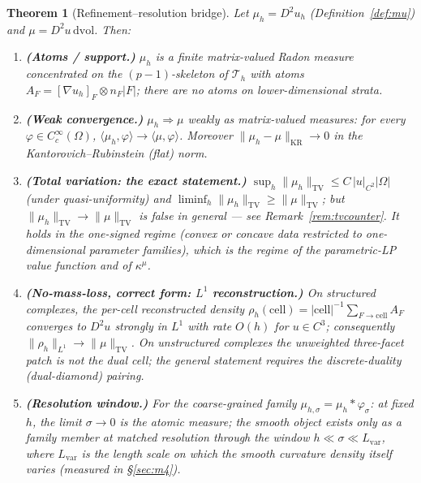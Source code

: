 \documentclass[11pt,a4paper]{article}
\theoremstyle{plain}
\newtheorem{theorem}{Theorem}[section]
\theoremstyle{definition}
\theoremstyle{remark}
\newcommand{\kmu}{\kappa^{\mu}}
\newcommand{\TV}{\mathrm{TV}}
\newcommand{\dvol}{\,\mathrm{dvol}}
\DeclareMathOperator{\KR}{KR}
\begin{document}
\begin{theorem}[Refinement--resolution bridge]
\label{thm:Bprime}
Let $\mu_h = D^2 u_h$ (Definition~\ref{def:mu}) and
$\mu = D^2u \dvol$. Then:
\begin{enumerate}[label=(\roman*),leftmargin=2em]
\item \textbf{(Atoms / support.)} $\mu_h$ is a finite matrix-valued Radon
      measure concentrated on the $(p-1)$-skeleton of $\mathcal{T}_h$ with
      atoms $A_F = [\nabla u_h]_F \otimes n_F |F|$; there are no atoms on
      lower-dimensional strata.
\item \textbf{(Weak convergence.)} $\mu_h \Rightarrow \mu$ weakly as
      matrix-valued measures: for every
      $\varphi \in C_c^\infty(\Omega)$,
      $\langle \mu_h, \varphi \rangle \to \langle \mu, \varphi \rangle$.
      Moreover $\|\mu_h - \mu\|_{\KR} \to 0$ in the
      Kantorovich--Rubinstein (flat) norm.
\item \textbf{(Total variation: the exact statement.)}
      $\sup_h \|\mu_h\|_{\TV} \le C\,|u|_{C^2}|\Omega|$ (under
      quasi-uniformity) and
      $\liminf_h \|\mu_h\|_{\TV} \ge \|\mu\|_{\TV}$; but
      $\|\mu_h\|_{\TV} \to \|\mu\|_{\TV}$ is \emph{false in general} ---
      see Remark~\ref{rem:tvcounter}. It holds in the one-signed regime
      (convex or concave data restricted to one-dimensional parameter
      families), which is the regime of the parametric-LP value function
      and of $\kmu$.
\item \textbf{(No-mass-loss, correct form: $L^1$ reconstruction.)}
      On structured complexes, the per-cell reconstructed density
      $\rho_h(\mathrm{cell}) = |\mathrm{cell}|^{-1} \sum_{F \to
      \mathrm{cell}} A_F$ converges to $D^2 u$ \emph{strongly in $L^1$}
      with rate $O(h)$ for $u \in C^3$; consequently
      $\|\rho_h\|_{L^1} \to \|\mu\|_{\TV}$. On unstructured complexes the
      unweighted three-facet patch is not the dual cell; the general statement
      requires the discrete-duality (dual-diamond) pairing.
\item \textbf{(Resolution window.)} For the coarse-grained family
      $\mu_{h,\sigma} = \mu_h * \varphi_\sigma$: at fixed $h$, the limit
      $\sigma \to 0$ is the \emph{atomic} measure; the smooth object
      exists only as a family member at matched resolution through the
      window $h \ll \sigma \ll L_{\mathrm{var}}$, where $L_{\mathrm{var}}$
      is the length scale on which the smooth curvature density itself
      varies (measured in \S\ref{sec:m4}).
\end{enumerate}
\end{theorem}
\end{document}
